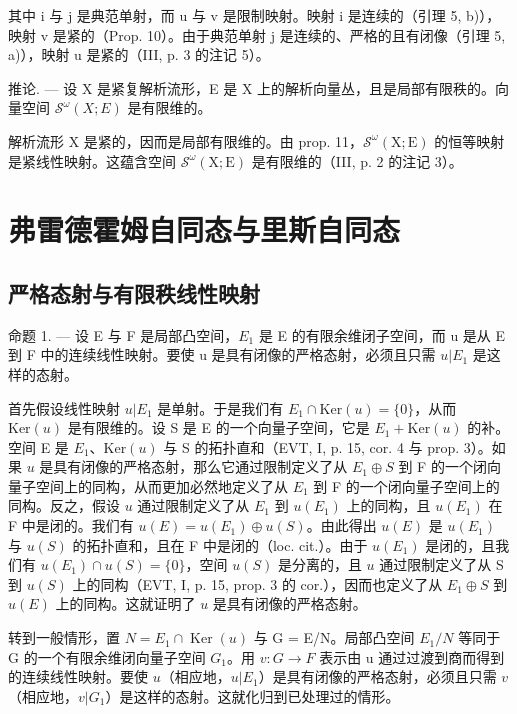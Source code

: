 其中 i 与 j 是典范单射，而 u 与 v 是限制映射。映射 i 是连续的（引理 5, b)），映射 v 是紧的（Prop. 10）。由于典范单射 j 是连续的、严格的且有闭像（引理 5, a)），映射 u 是紧的（III, p. 3 的注记 5）。

推论. --- 设 X 是紧复解析流形，E 是 X 上的解析向量丛，且是局部有限秩的。向量空间 \(\mathcal{S}^{\omega}(X;E)\) 是有限维的。

解析流形 X 是紧的，因而是局部有限维的。由 prop. 11，\(\mathcal{S}^{\omega}(\mathrm{X};\mathrm{E})\) 的恒等映射是紧线性映射。这蕴含空间 \(\mathcal{S}^{\omega}(\mathrm{X};\mathrm{E})\) 是有限维的（III, p. 2 的注记 3）。

\section{弗雷德霍姆自同态与里斯自同态}

\subsection{严格态射与有限秩线性映射}

命题 1. --- 设 E 与 F 是局部凸空间，\(E_{1}\) 是 E 的有限余维闭子空间，而 u 是从 E 到 F 中的连续线性映射。要使 u 是具有闭像的严格态射，必须且只需 \(u|E_{1}\) 是这样的态射。

首先假设线性映射 \(u|E_1\) 是单射。于是我们有 \(E_1 \cap \text{Ker}(u) = \{0\}\)，从而 \(\text{Ker}(u)\) 是有限维的。设 S 是 E 的一个向量子空间，它是 \(E_1 + \text{Ker}(u)\) 的补。空间 E 是 \(E_1\)、\(\text{Ker}(u)\) 与 S 的拓扑直和（EVT, I, p. 15, cor. 4 与 prop. 3）。如果 \(u\) 是具有闭像的严格态射，那么它通过限制定义了从 \(E_1 \oplus S\) 到 F 的一个闭向量子空间上的同构，从而更加必然地定义了从 \(E_1\) 到 F 的一个闭向量子空间上的同构。反之，假设 \(u\) 通过限制定义了从 \(E_1\) 到 \(u(E_1)\) 上的同构，且 \(u(E_1)\) 在 F 中是闭的。我们有 \(u(E) = u(E_1) \oplus u(S)\)。由此得出 \(u(E)\) 是 \(u(E_1)\) 与 \(u(S)\) 的拓扑直和，且在 F 中是闭的（loc. cit.）。由于 \(u(E_1)\) 是闭的，且我们有 \(u(E_1) \cap u(S) = \{0\}\)，空间 \(u(S)\) 是分离的，且 \(u\) 通过限制定义了从 S 到 \(u(S)\) 上的同构（EVT, I, p. 15, prop. 3 的 cor.），因而也定义了从 \(E_1 \oplus S\) 到 \(u(E)\) 上的同构。这就证明了 \(u\) 是具有闭像的严格态射。

转到一般情形，置 \(N = E_{1} \cap \operatorname{Ker}(u)\) 与 G = E/N。局部凸空间 \(E_{1}/N\) 等同于 G 的一个有限余维闭向量子空间 \(G_{1}\)。用 \(v\colon G \to F\) 表示由 u 通过过渡到商而得到的连续线性映射。要使 \(u\)（相应地，\(u|E_{1}\)）是具有闭像的严格态射，必须且只需 \(v\)（相应地，\(v|G_{1}\)）是这样的态射。这就化归到已处理过的情形。


